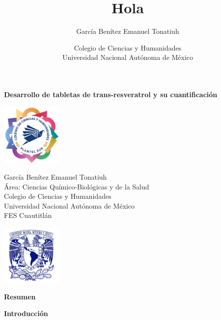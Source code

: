 \documentclass[11pt]{article}
\title{Hola}
\author{García Benítez Emanuel Tonatiuh}
\date{Colegio de Ciencias y Humanidades\\
        Universidad Nacional Autónoma de México}
\theoremstyle{mytheoremstyle}
\theoremstyle{mytheoremstyle}
\theoremstyle{myproblemstyle}
\begin{document}
\onehalfspacing

\begin{center}
    {\LARGE \textbf{Desarrollo de tabletas de trans-resveratrol y su cuantificación}}
\end{center}
\vspace{1cm}

\noindent
\begin{minipage}[c]{0.2\textwidth}
    \centering
    \includegraphics[width=3cm]{img/cch.png}
\end{minipage}
\hfill
\begin{minipage}[c]{0.55\textwidth}
    \centering
    {\large García Benítez Emanuel Tonatiuh}\\[0.5cm]
    {\large Área: Ciencias Químico-Biológicas y de la Salud}\\[0.5cm]
    {\large Colegio de Ciencias y Humanidades}\\
    {\large Universidad Nacional Autónoma de México}\\
    {\large FES Cuautitlán}\\
\end{minipage}
\hfill
\begin{minipage}[c]{0.2\textwidth}
    \centering
    \includegraphics[width=3.0cm]{img/UNAM.jpg}
\end{minipage}

\vspace{1cm}

\textbf{Resumen}

\textbf{Introducción}



\printbibliography
\end{document}
